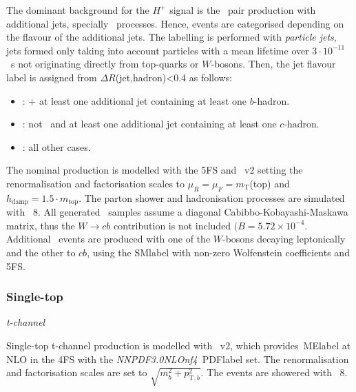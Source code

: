 The dominant background for the $H^+$ signal is the \ttbar\ pair production with additional jets, specially \ttb\ processes. Hence, events are categorised depending on the flavour of the additional jets. The labelling is performed with \textit{particle jets}, jets formed only taking into account particles with a mean lifetime over $3\cdot10^{-11}$~s not originating directly from top-quarks or $W$-bosons. Then, the jet flavour label is assigned from $\Delta R$(jet,hadron)<0.4 as follows:
\begin{itemize}
    \item \ttb: \ttbar + at least one additional jet containing at least one $b$-hadron.
    \item \ttc: not \ttb\ and at least one additional jet containing at least one $c$-hadron.
    \item \ttl: all other cases.
\end{itemize}

The nominal production is modelled with the 5FS and \POWHEGBOX~v2 setting the renormalisation and factorisation scales to $\mu_R = \mu_F = m_\text{T}$(top) and $h_\text{damp}=1.5\cdot m_\text{top}$. The parton shower and hadronisation processes are simulated with \PYTHIA~8. All generated \ttbar\ samples assume a diagonal Cabibbo-Kobayashi-Maskawa matrix, thus the $W\to cb$ contribution is not included $(B = 5.72 \times 10^{-4}$. Additional \ttjets\ events are produced with one of the $W$-bosons decaying leptonically and the other to $cb$, using the \acrshort{SMlabel} with non-zero Wolfenstein coefficients and 5FS.

\subsubsection{Single-top}
\textit{t-channel}

Single-top t-channel production is modelled with \POWHEGBOX~v2, which provides~\acrshort{MElabel} at NLO in the 4FS with the \textit{NNPDF3.0NLOnf4}~\acrshort{PDFlabel} set. The renormalisation and factorisation scales are set to $\sqrt{m_b^2+p_{\text{T},b}^2}$. The events are showered with \PYTHIA~8.

